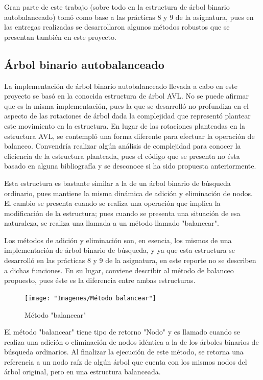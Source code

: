\documentclass[letterpaper, 11pt]{article}
\begin{document}
	Gran parte de este trabajo (sobre todo en la estructura de árbol binario autobalanceado) tomó como base a las prácticas 8 y 9 de la asignatura, pues en las entregas realizadas se desarrollaron algunos métodos robustos que se presentan también en este proyecto.
	
	\subsection*{Árbol binario autobalanceado}
	
	La implementación de árbol binario autobalanceado llevada a cabo en este proyecto se basó en la conocida estructura de árbol AVL. No se puede afirmar que es la misma implementación, pues la que se desarrolló no profundiza en el aspecto de las rotaciones de árbol dada la complejidad que representó plantear este movimiento en la estructura. 
	En lugar de las rotaciones planteadas en la estructura AVL, se contempló una forma diferente para efectuar la operación de balanceo. Convendría realizar algún análisis de complejidad para conocer la eficiencia de la estructura planteada, pues el código que se presenta no ésta basado en alguna bibliografía y se desconoce si ha sido propuesta anteriormente.
	
	Esta estructura es bastante similar a la de un árbol binario de búsqueda ordinario, pues mantiene la misma dinámica de adición y eliminación de nodos. El cambio se presenta cuando se realiza una operación que implica la modificación de la estructura; pues cuando se presenta una situación de esa naturaleza, se realiza una llamada a un método llamado "balancear". 
	
	Los métodos de adición y eliminación son, en esencia, los mismos de una implementación de árbol binario de búsqueda, y ya que esta estructura se desarrolló en las prácticas 8 y 9 de la asignatura, en este reporte no se describen a dichas funciones. En su lugar, conviene describir al método de balanceo propuesto, pues éste es la diferencia entre ambas estructuras.
	
	\begin{figure}[H]
		\centering
		\texttt{[image: "Imagenes/Método balancear"]}
		\caption{Método "balancear"}
	\end{figure}
	 
	 El método "balancear" tiene tipo de retorno "Nodo" y es llamado cuando se realiza una adición o eliminación de nodos idéntica a la de los árboles binarios de búsqueda ordinarios. Al finalizar la ejecución de este método, se retorna una referencia a un nodo raíz de algún árbol que cuenta con los mismos nodos del árbol original, pero en una estructura balanceada.
	 
\end{document}
